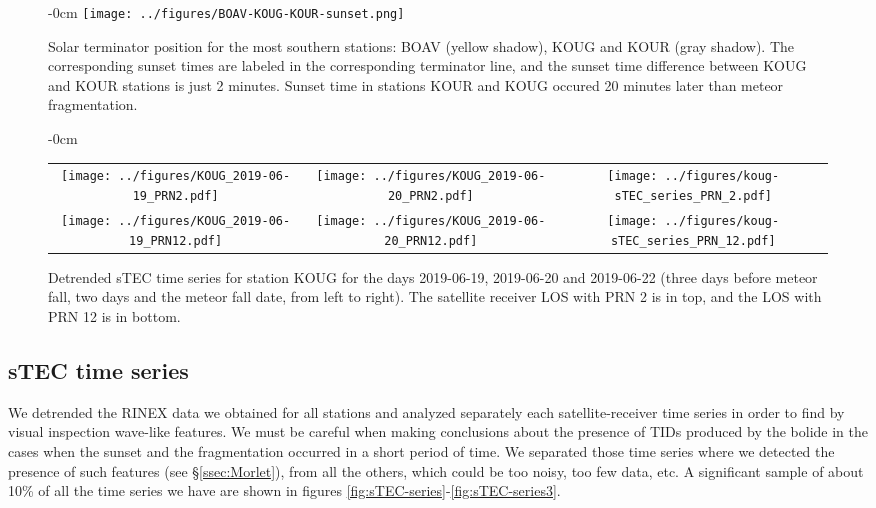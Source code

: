 \begin{figure}
    \centering
    \begin{adjustwidth}{-\extralength}{0cm}
    \texttt{[image: ../figures/BOAV-KOUG-KOUR-sunset.png]}
    \end{adjustwidth}
    \caption{Solar terminator position for the most southern stations: BOAV (yellow shadow), KOUG and KOUR (gray shadow). The corresponding sunset times are labeled in the corresponding terminator line, and the sunset time difference between KOUG and KOUR stations is just 2 minutes. Sunset time in stations KOUR and KOUG occured 20 minutes later than meteor fragmentation.}
    \label{fig:solar_terminator}
\end{figure}

\begin{figure*}
    \centering
    \begin{adjustwidth}{-\extralength}{0cm}
    \begin{tabular}{ccc}
    \texttt{[image: ../figures/KOUG\_2019-06-19\_PRN2.pdf]} & \texttt{[image: ../figures/KOUG\_2019-06-20\_PRN2.pdf]}& \texttt{[image: ../figures/koug-sTEC\_series\_PRN\_2.pdf]} \\
    \texttt{[image: ../figures/KOUG\_2019-06-19\_PRN12.pdf]} & \texttt{[image: ../figures/KOUG\_2019-06-20\_PRN12.pdf]} & \texttt{[image: ../figures/koug-sTEC\_series\_PRN\_12.pdf]}
    \end{tabular}
    \end{adjustwidth}
    \caption{Detrended sTEC time series for station KOUG for the days 2019-06-19, 2019-06-20 and 2019-06-22 (three days before meteor fall, two days and the meteor fall date, from left to right). The satellite receiver LOS with PRN 2 is in top, and the LOS with PRN 12 is in bottom.}
    \label{fig:solar_terminator_time_series}
\end{figure*}

\subsection{sTEC time series}

We detrended the RINEX data we obtained for all stations and analyzed separately each satellite-receiver time series in order to find by visual inspection wave-like features. We must be careful when making conclusions about the presence of TIDs produced by the bolide in the cases when the sunset and the fragmentation occurred in a short period of time. We separated those time series where we detected the presence of such features (see \S \ref{ssec:Morlet}), from all the others, which could be too noisy, too few data, etc. A significant sample of about 10\% of all the time series we have are shown in figures \ref{fig:sTEC-series}-\ref{fig:sTEC-series3}.  

